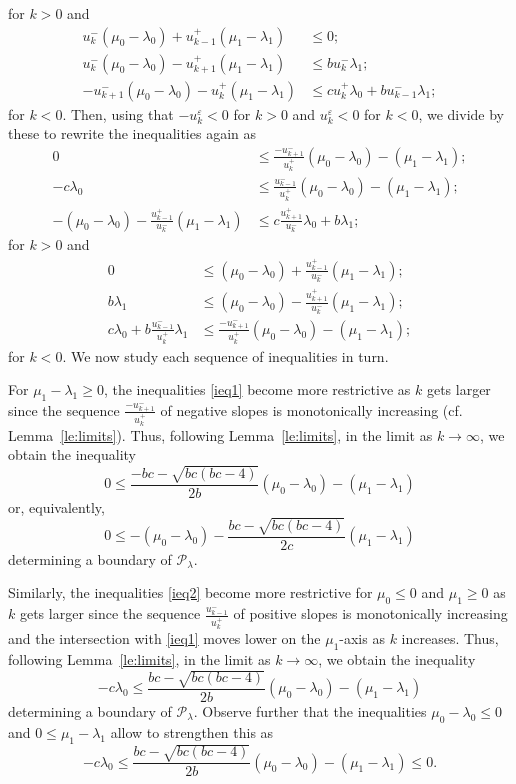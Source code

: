 \documentclass{amsart}
\numberwithin{theorem}{section}
\newcommand{\cP}{\mathcal{P}}
\begin{document}
  for $k>0$ and
  \begin{align*}
    u_k^-(\mu_0-\lambda_0)+u_{k-1}^+(\mu_1-\lambda_1) &\le 0;\\
    u_k^-(\mu_0-\lambda_0)-u_{k+1}^+(\mu_1-\lambda_1) &\le bu_k^-\lambda_1;\\
    -u_{k+1}^-(\mu_0-\lambda_0)-u_k^+(\mu_1-\lambda_1) &\le cu_k^+\lambda_0+bu_{k-1}^-\lambda_1;
  \end{align*}
  for $k<0$.
  Then, using that $-u_k^\varepsilon<0$ for $k>0$ and $u_k^\varepsilon<0$ for $k<0$, we divide by these to rewrite the inequalities again as
  \begin{align}
    \label{ieq1} 0 & \le \frac{-u_{k+1}^-}{u_k^+}(\mu_0-\lambda_0)-(\mu_1-\lambda_1);\\
    \label{ieq2} -c\lambda_0 & \le \frac{u_{k-1}^-}{u_k^+}(\mu_0-\lambda_0)-(\mu_1-\lambda_1);\\
    \label{ieq3} -(\mu_0-\lambda_0)-\frac{u_{k-1}^+}{u_k^-}(\mu_1-\lambda_1) &\le c\frac{u_{k+1}^+}{u_k^-}\lambda_0+b\lambda_1;
  \end{align}
  for $k>0$ and
  \begin{align}
    \label{ieq4} 0 &\le (\mu_0-\lambda_0)+\frac{u_{k-1}^+}{u_k^-}(\mu_1-\lambda_1);\\
    \label{ieq5} b\lambda_1 &\le (\mu_0-\lambda_0)-\frac{u_{k+1}^+}{u_k^-}(\mu_1-\lambda_1);\\
    \label{ieq6} c\lambda_0+b\frac{u_{k-1}^-}{u_k^+}\lambda_1 &\le \frac{-u_{k+1}^-}{u_k^+}(\mu_0-\lambda_0)-(\mu_1-\lambda_1);
  \end{align}
  for $k<0$.
  We now study each sequence of inequalities in turn.

  For $\mu_1-\lambda_1\ge 0$, the inequalities \eqref{ieq1} become more restrictive as $k$ gets larger since the sequence $\frac{-u_{k+1}^-}{u_k^+}$ of negative slopes is monotonically increasing (cf. Lemma~\ref{le:limits}).
  Thus, following Lemma~\ref{le:limits}, in the limit as $k\to\infty$, we obtain the inequality 
  \[ 0 \le \frac{-bc-\sqrt{bc(bc-4)}}{2b}(\mu_0-\lambda_0)-(\mu_1-\lambda_1) \]
  or, equivalently,
  \[ 0 \le -(\mu_0-\lambda_0)-\frac{bc-\sqrt{bc(bc-4)}}{2c}(\mu_1-\lambda_1) \]
  determining a boundary of $\cP_\lambda$.

  Similarly, the inequalities \eqref{ieq2} become more restrictive for $\mu_0\le0$ and $\mu_1\ge0$ as $k$ gets larger since the sequence $\frac{u_{k-1}^-}{u_k^+}$ of positive slopes is monotonically increasing and the intersection with \eqref{ieq1} moves lower on the $\mu_1$-axis as $k$ increases.
  Thus, following Lemma~\ref{le:limits}, in the limit as $k\to\infty$, we obtain the inequality
  \[ -c\lambda_0 \le \frac{bc-\sqrt{bc(bc-4)}}{2b}(\mu_0-\lambda_0)-(\mu_1-\lambda_1) \]
  determining a boundary of $\cP_\lambda$.
  Observe further that the inequalities $\mu_0-\lambda_0 \le 0$ and $0 \le \mu_1-\lambda_1$ allow to strengthen this as
  \[ -c\lambda_0 \le \frac{bc-\sqrt{bc(bc-4)}}{2b}(\mu_0-\lambda_0)-(\mu_1-\lambda_1) \le 0. \]
\end{document}

